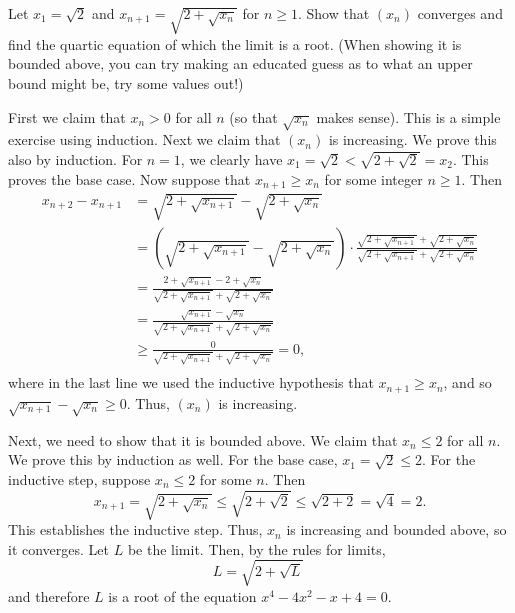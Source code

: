 \documentclass[11pt,dvipsnames]{book}
\numberwithin{figure}{section} %
\numberwithin{table}{section} %
\begin{document}
\begin{exercise} Let $x_{1}=\sqrt{2}$ and $x_{n+1}=\sqrt{2+\sqrt{x_{n}}}$ for $n \geq 1$. Show that $(x_n)$ converges and find the quartic equation of which the limit is a root. (When showing it is bounded above, you can try making an educated guess as to what an upper bound might be, try some values out!)

\begin{solution}
First we claim that $x_n >0$ for all $n$ (so that $\sqrt{x_n}$ makes sense). This is a simple exercise using induction. Next we claim that $(x_{n})$ is increasing. We prove this also by induction. For $n=1$, we clearly have $x_{1}=\sqrt{2}<\sqrt{2+\sqrt{2}}=x_{2}$. This proves the base case. Now suppose that $x_{n+1}\geq x_{n}$ for some integer $n\geq 1$. Then
\begin{align*}
x_{n+2}-x_{n+1}
& =\sqrt{2+\sqrt{x_{n+1}}}-\sqrt{2+\sqrt{x_{n}}}\\
& =\left(\sqrt{2+\sqrt{x_{n+1}}}-\sqrt{2+\sqrt{x_{n}}}\right)\cdot \frac{\sqrt{2+\sqrt{x_{n+1}}}+\sqrt{2+\sqrt{x_{n}}}}{\sqrt{2+\sqrt{x_{n+1}}}+\sqrt{2+\sqrt{x_{n}}}}\\
& = \frac{2+\sqrt{x_{n+1}}-2+\sqrt{x_{n}}}{\sqrt{2+\sqrt{x_{n+1}}}+\sqrt{2+\sqrt{x_{n}}}}\\
& = \frac{\sqrt{x_{n+1}}-\sqrt{x_{n}}}{\sqrt{2+\sqrt{x_{n+1}}}+\sqrt{2+\sqrt{x_{n}}}}\\
& \geq \frac{0}{\sqrt{2+\sqrt{x_{n+1}}}+\sqrt{2+\sqrt{x_{n}}}}=0,\\
\end{align*}
where in the last line we used the inductive hypothesis that $x_{n+1}\geq x_{n}$, and so $\sqrt{x_{n+1}}-\sqrt{x_{n}}\geq 0$. Thus, $(x_{n})$ is increasing.

Next, we need to show that it is bounded above. We claim that $x_{n}\leq 2$ for all $n$. We prove this by induction as well. For the base case, $x_{1}=\sqrt{2}\leq 2$. For the inductive step, suppose $x_{n}\leq 2$ for some $n$. Then
\[
x_{n+1}=\sqrt{2+\sqrt{x_{n}}}\leq \sqrt{2+\sqrt{2}}\leq \sqrt{2+2}=\sqrt{4}=2.
\]
This establishes the inductive step. Thus, $x_{n}$ is increasing and bounded above, so it converges. Let $L$ be the limit. Then, by the rules for limits,
\[L = \sqrt{2+\sqrt{L}}\
\]
and therefore $L$ is a root of the equation $x^4 - 4x^2 -x + 4 = 0$.
\end{solution}
\end{exercise}
\end{document}
